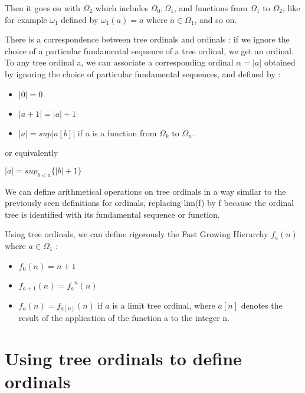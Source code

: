 \documentclass[10pt]{article}
\begin{document}
Then it goes on with \( \Omega_2 \) which includes \( \Omega_0, \Omega_1 \), and functions from \( \Omega_1 \) to \( \Omega_2 \), like for example \( \omega_1 \) defined by \( \omega_1(a) = a \) where \( a \in \Omega_1 \), and so on.

There is a correspondence between tree ordinals and ordinals : if we ignore the choice of a particular fundamental sequence of a tree ordinal, we get an ordinal. To any tree ordinal a, we can associate a corresponding ordinal \( \alpha = |a| \) obtained by ignoring the choice of particular fundamental sequences, and defined by :

\begin{itemize}
     \setlength{\itemsep}{1pt}
     \setlength{\parskip}{0pt}
     \setlength{\parsep}{0pt}
\item \( |0| = 0 \)
\item \( |a+1| = |a|+1 \)
\item \( |a| = sup |a[b]| \) if a is a function from \( \Omega_k \) to \( \Omega_n \).
\end{itemize}

or equivalently

\( |a| = sup_{b<a} \lbrace |b|+1 \rbrace \)

\bigskip

We can define arithmetical operations on tree ordinals in a way similar to the previously seen definitions for ordinals, replacing lim(f) by f because the ordinal tree is identified with its fundamental sequence or function.

\bigskip

Using tree ordinals, we can define rigorously the Fast Growing Hierarchy \( f_a(n) \) where \( a \in \Omega_1 \) :

\begin{itemize}
     \setlength{\itemsep}{1pt}
     \setlength{\parskip}{0pt}
     \setlength{\parsep}{0pt}
\item \( f_0(n) = n+1 \)
\item \( f_{a+1}(n) = {f_a}^n(n) \)
\item \( f_a(n) = f_{a[n]}(n) \) if \( a \) is a limit tree ordinal, where \( a[n] \) denotes the result of the application of the function a to the integer n.
\end{itemize}

\section{Using tree ordinals to define ordinals}
\end{document}
